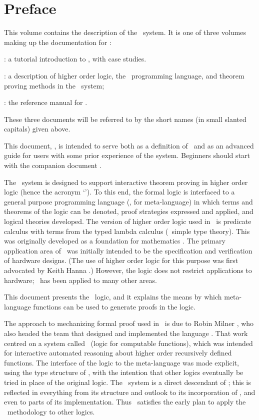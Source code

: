 \chapter*{Preface}
\label{intro}

This volume contains the  description of  the \HOL\  system.
It is one of three volumes making up the documentation for \HOL:

\begin{myenumerate}
\item \TUTORIAL: a tutorial introduction to \HOL, with case studies.
\item \DESCRIPTION: a description of higher order logic,
the \ML\ programming language, and theorem proving methods in the \HOL\ system;
\item \REFERENCE: the reference manual for \HOL.
\end{myenumerate}

\noindent These three documents will be referred to by the short names (in
small slanted capitals) given above.

This document, \DESCRIPTION, is intended to serve both as a definition of \HOL\
and as an advanced guide for users with some prior experience of the system.
Beginners should start with the companion document \TUTORIAL.

The \HOL\ system is designed to support interactive theorem proving in
higher order logic (hence the acronym `\HOL').  To this end, the formal
logic is interfaced to a general purpose programming language (\ML, for
meta-language) in which terms and theorems of the logic can be denoted,
proof strategies expressed and applied, and logical theories developed.
The version of higher order logic used in \HOL\ is predicate calculus
with terms from the typed lambda calculus (\ie\ simple type
theory). This was originally developed as a foundation for mathematics
\cite{Church}.  The primary application area of \HOL\ was initially
intended to be the specification and verification of hardware designs.
(The use of higher order logic for this purpose was first advocated by
Keith Hanna \cite{Hanna-Daeche}.)  However, the logic does not restrict
applications to hardware; \HOL\ has been applied to many other areas.

This document presents the \HOL\ logic, and it explains the means by which
meta-language functions can be used to generate proofs in the logic.

The approach to mechanizing formal proof used in \HOL\ is due to Robin Milner
\cite{Edinburgh-LCF}, who also headed the team that designed and implemented
the language \ML.  That work centred on a system called \LCF\ (logic for
computable functions), which was intended for interactive automated reasoning
about higher order recursively defined functions.  The interface of the logic
to the meta-language was made explicit, using the type structure of \ML, with
the intention that other logics eventually be tried in place of the original
logic.  The \HOL\ system is a direct descendant of \LCF; this is reflected in
everything from its structure and outlook to its incorporation of \ML, and even
to parts of its implementation.  Thus \HOL\ satisfies the early plan to apply
the \LCF\ methodology to other logics.

